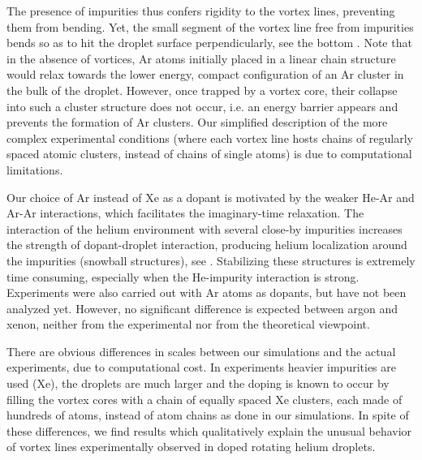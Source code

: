 The presence of impurities thus confers rigidity to the vortex lines,
preventing them from bending. Yet, the small segment of the vortex line free from impurities bends so as to hit 
the droplet surface perpendicularly, see the bottom .
Note that in the absence of vortices, Ar atoms initially placed
in a linear chain structure would relax towards the lower energy, compact 
configuration of an Ar cluster in the bulk of the droplet.
However, once trapped by a vortex core, their collapse 
into such a cluster structure does not occur,
i.e. an energy barrier appears and prevents the formation of Ar
clusters. 
Our simplified 
description of the more complex experimental 
conditions (where each vortex line hosts chains of regularly spaced
atomic clusters, instead of chains of single atoms)
is due to computational limitations.

Our choice of Ar instead of Xe as a dopant is motivated by the weaker He-Ar and Ar-Ar interactions, which 
facilitates the imaginary-time relaxation. The interaction of the helium environment with several close-by impurities increases the 
strength of  dopant-droplet interaction, producing  
helium localization around the impurities (snowball structures), see . Stabilizing these
structures is extremely time consuming, 
especially when the He-impurity interaction is strong.
Experiments were also carried out with Ar atoms as dopants, 
but have not been analyzed yet.
However, no significant difference is expected between argon and xenon, 
neither from the experimental nor from the theoretical viewpoint.

There are obvious differences in scales between our simulations and  
 the actual experiments,  due to  computational 
cost. In experiments heavier impurities are used (Xe), 
the droplets are much larger
and the doping is known to occur by filling the vortex cores with a chain 
of equally spaced Xe clusters, each made of
hundreds of atoms, instead of atom chains as done in our simulations.
In spite of these differences, we find results which  
qualitatively explain the unusual behavior of vortex lines 
experimentally observed in doped rotating helium droplets.

